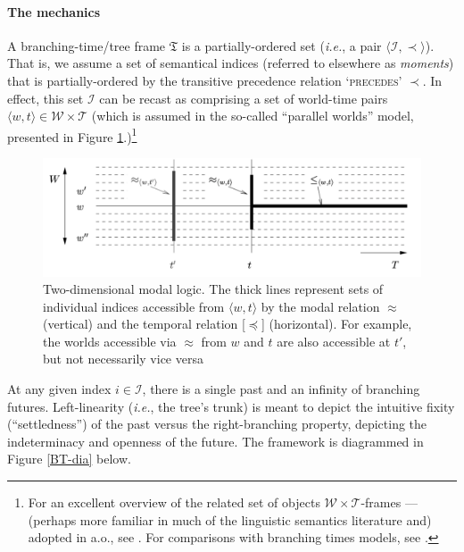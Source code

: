 \documentclass[12pt,dvipsnames]{report}
\begin{document}
\paragraph{The mechanics} A branching-time/tree frame $ \mathfrak T$ is a partially-ordered set (\textit{i.e.}, a pair $\langle \mathcal{I,\prec}\rangle $). That is, we assume a set of semantical indices (referred to elsewhere as \textit{moments}) that is partially-ordered by the transitive precedence relation \textsc{`precedes'} $ \boldsymbol\prec $. In effect, this set $ \mathcal I $ can be recast as comprising a set of world-time pairs $ \langle w,t\rangle\in\mathcal{W\times T} $ (which is assumed in the so-called ``parallel worlds'' model, presented in Figure \ref{KCH-WTframe}.)\footnote{For an excellent overview of the related set of objects $ \mathcal{W\times T} $-frames --- (perhaps more familiar in much of the linguistic semantics literature and) adopted in \citet{Kaufmann2005,Condoravdi2002,Klecha2016a} a.o., see \citet*{Kaufmann2006}. For comparisons with branching times models, see \citealt{Thomason1970,Thomason1984,Rumberg2016}.}


\begin{figure}[b]
	\centering
	\includegraphics[width=0.8\linewidth]{KCH06-95-WTframe}
		\caption[$ \mathcal{W\times T} $-frame]{Two-dimensional modal logic. The thick lines represent sets of individual indices accessible from $ \langle w,t\rangle $ by the modal relation $ \approx $ (vertical) and the temporal relation [$ \preccurlyeq $] (horizontal). For example, the worlds accessible via $ \approx $ from $ w $ and $ t $ are also accessible at $ t' $, but not necessarily vice versa \citep*[diagram and caption from][95]{Kaufmann2006}}	\label{KCH-WTframe}
\end{figure}



At any given index $ i\in\mathcal I $, there is a single past and an infinity of branching futures. Left-linearity (\textit{i.e.}, the tree's trunk) is meant to depict the intuitive fixity (``settledness'') of the past versus the right-branching property, depicting the indeterminacy and openness of the future.
The framework is diagrammed in Figure \ref{BT-dia} below.
\end{document}
